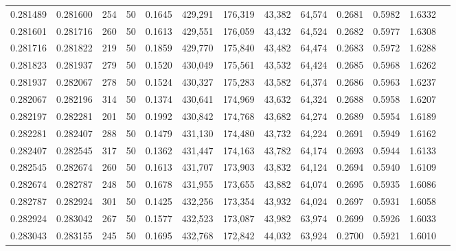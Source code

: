 \begin{tabular}{rrrrrrrrrrrrr}
0.281489 & 0.281600 &   254 &  50 &                                     0.1645 & 429,291 & 176,319 &  43,382 &  64,574 & 0.2681 & 0.5982 & 1.6332 \\
0.281601 & 0.281716 &   260 &  50 &                                     0.1613 & 429,551 & 176,059 &  43,432 &  64,524 & 0.2682 & 0.5977 & 1.6308 \\
0.281716 & 0.281822 &   219 &  50 &                                     0.1859 & 429,770 & 175,840 &  43,482 &  64,474 & 0.2683 & 0.5972 & 1.6288 \\
0.281823 & 0.281937 &   279 &  50 &                                     0.1520 & 430,049 & 175,561 &  43,532 &  64,424 & 0.2685 & 0.5968 & 1.6262 \\
0.281937 & 0.282067 &   278 &  50 &                                     0.1524 & 430,327 & 175,283 &  43,582 &  64,374 & 0.2686 & 0.5963 & 1.6237 \\
0.282067 & 0.282196 &   314 &  50 &                                     0.1374 & 430,641 & 174,969 &  43,632 &  64,324 & 0.2688 & 0.5958 & 1.6207 \\
0.282197 & 0.282281 &   201 &  50 &                                     0.1992 & 430,842 & 174,768 &  43,682 &  64,274 & 0.2689 & 0.5954 & 1.6189 \\
0.282281 & 0.282407 &   288 &  50 &                                     0.1479 & 431,130 & 174,480 &  43,732 &  64,224 & 0.2691 & 0.5949 & 1.6162 \\
0.282407 & 0.282545 &   317 &  50 &                                     0.1362 & 431,447 & 174,163 &  43,782 &  64,174 & 0.2693 & 0.5944 & 1.6133 \\
0.282545 & 0.282674 &   260 &  50 &                                     0.1613 & 431,707 & 173,903 &  43,832 &  64,124 & 0.2694 & 0.5940 & 1.6109 \\
0.282674 & 0.282787 &   248 &  50 &                                     0.1678 & 431,955 & 173,655 &  43,882 &  64,074 & 0.2695 & 0.5935 & 1.6086 \\
0.282787 & 0.282924 &   301 &  50 &                                     0.1425 & 432,256 & 173,354 &  43,932 &  64,024 & 0.2697 & 0.5931 & 1.6058 \\
0.282924 & 0.283042 &   267 &  50 &                                     0.1577 & 432,523 & 173,087 &  43,982 &  63,974 & 0.2699 & 0.5926 & 1.6033 \\
0.283043 & 0.283155 &   245 &  50 &                                     0.1695 & 432,768 & 172,842 &  44,032 &  63,924 & 0.2700 & 0.5921 & 1.6010 \\

\end{tabular}
